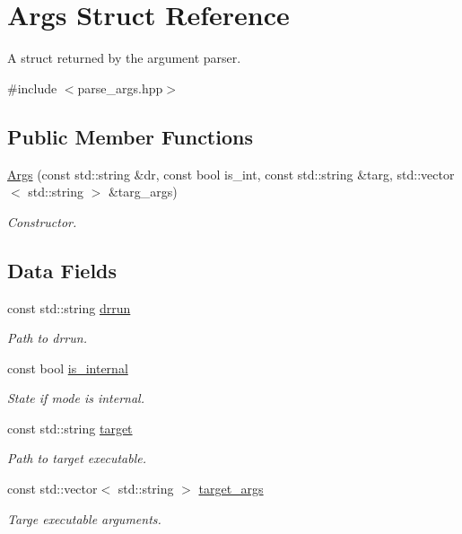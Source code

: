 \hypertarget{struct_args}{}\section{Args Struct Reference}
\label{struct_args}


A struct returned by the argument parser.  




{\ttfamily \#include $<$parse\+\_\+args.\+hpp$>$}

\subsection*{Public Member Functions}
\begin{DoxyCompactItemize}
\item 
\hyperlink{struct_args_a88c885088024ce5e9585b5a2d6db4e09}{Args} (const std\+::string \&dr, const bool is\+\_\+int, const std\+::string \&targ, std\+::vector$<$ std\+::string $>$ \&targ\+\_\+args)
\begin{DoxyCompactList}\small\item\em Constructor. \end{DoxyCompactList}\end{DoxyCompactItemize}
\subsection*{Data Fields}
\begin{DoxyCompactItemize}
\item 
const std\+::string \hyperlink{struct_args_afd47a15e870aaf33b2ad41f55aebaa4e}{drrun}
\begin{DoxyCompactList}\small\item\em Path to drrun. \end{DoxyCompactList}\item 
const bool \hyperlink{struct_args_a52d1f8c8297b000e30ff84b9ff1b9321}{is\+\_\+internal}
\begin{DoxyCompactList}\small\item\em State if mode is internal. \end{DoxyCompactList}\item 
const std\+::string \hyperlink{struct_args_a49f5255b7466ee4e1329aa32ca069da6}{target}
\begin{DoxyCompactList}\small\item\em Path to target executable. \end{DoxyCompactList}\item 
const std\+::vector$<$ std\+::string $>$ \hyperlink{struct_args_aa9f8e387df0b3691352daf352876176d}{target\+\_\+args}
\begin{DoxyCompactList}\small\item\em Targe executable arguments. \end{DoxyCompactList}\end{DoxyCompactItemize}


